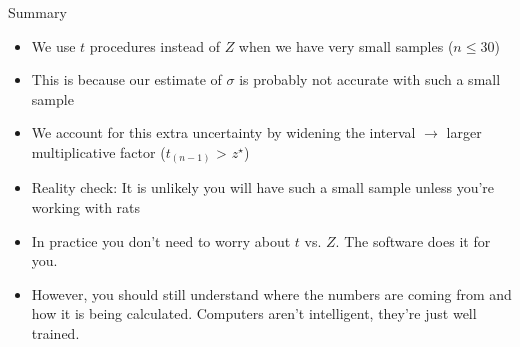 \documentclass[10pt]{beamer}\usepackage[]{graphicx}\usepackage[]{color}
\begin{document}
\begin{frame}{Summary}
	\begin{itemize}
		\setlength\itemsep{1em}
		\item We use $t$ procedures instead of $Z$ when we have very small samples ($n \leq 30$)
		\item This is because our estimate of $\sigma$ is probably not accurate with such a small sample
		\item We account for this extra uncertainty by widening the interval $\to$ larger multiplicative factor ($t_{(n-1)}$ > $z^\star$) \pause 
		\item Reality check: It is unlikely you will have such a small sample unless you're working with rats
		\item In practice you don't need to worry about $t$ vs. $Z$. The software does it for you.
		\item However, you should still understand where the numbers are coming from and how it is being calculated. Computers aren't intelligent, they're just well trained. 
	\end{itemize}
\end{frame}
\end{document}
